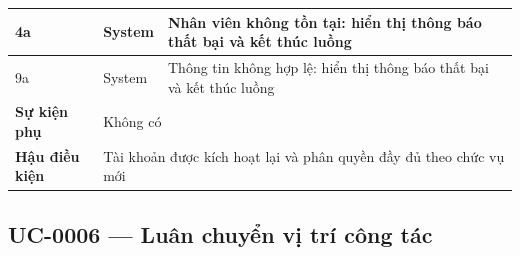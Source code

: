 \documentclass[../DoAn.tex]{subfiles}
\begin{document}
\begin{table}[H]
\begin{tabular}{|p{3.0cm}|p{2.3cm}|p{2.7cm}|p{4.5cm}|}
\hline
4a & System & \multicolumn{2}{p{7.2cm}|}{Nhân viên không tồn tại: hiển thị thông báo thất bại và kết thúc luồng} \\
\hline
9a & System & \multicolumn{2}{p{7.2cm}|}{Thông tin không hợp lệ: hiển thị thông báo thất bại và kết thúc luồng} \\
\hline
\textbf{Sự kiện phụ} & \multicolumn{3}{p{9.5cm}|}{Không có} \\
\hline
\textbf{Hậu điều kiện} & \multicolumn{3}{p{9.5cm}|}{Tài khoản được kích hoạt lại và phân quyền đầy đủ theo chức vụ mới} \\
\hline
\end{tabular}
\end{table}

\subsection{UC-0006 — Luân chuyển vị trí công tác}
\end{document}
